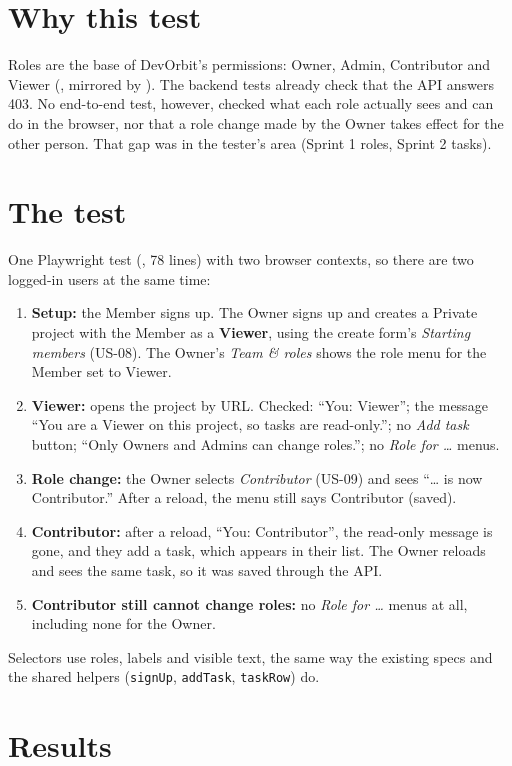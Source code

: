\documentclass[11pt,a4paper]{article}
\begin{document}
\section{Why this test}
Roles are the base of DevOrbit's permissions: Owner, Admin, Contributor and Viewer (, mirrored by
). The backend tests already check that the API answers 403. No end-to-end test, however, checked what each
role actually sees and can do in the browser, nor that a role change made by the Owner takes effect for the other person.
That gap was in the tester's area (Sprint 1 roles, Sprint 2 tasks).

\section{The test}
One Playwright test (, 78 lines) with two browser contexts, so there are two logged-in users at the same time:
\begin{enumerate}
\item \textbf{Setup:} the Member signs up. The Owner signs up and creates a Private project with the Member as a \textbf{Viewer},
      using the create form's \emph{Starting members} (US-08). The Owner's \emph{Team \& roles} shows the role menu for the Member set to Viewer.
\item \textbf{Viewer:} opens the project by URL. Checked: ``You: Viewer''; the message ``You are a Viewer on this project, so tasks are read-only.'';
      no \emph{Add task} button; ``Only Owners and Admins can change roles.''; no \emph{Role for \ldots} menus.
\item \textbf{Role change:} the Owner selects \emph{Contributor} (US-09) and sees ``\ldots{} is now Contributor.'' After a reload, the menu still says Contributor (saved).
\item \textbf{Contributor:} after a reload, ``You: Contributor'', the read-only message is gone, and they add a task, which appears in their list.
      The Owner reloads and sees the same task, so it was saved through the API.
\item \textbf{Contributor still cannot change roles:} no \emph{Role for \ldots} menus at all, including none for the Owner.
\end{enumerate}
Selectors use roles, labels and visible text, the same way the existing specs and the shared helpers (\texttt{signUp}, \texttt{addTask}, \texttt{taskRow}) do.

\section{Results}
\end{document}
